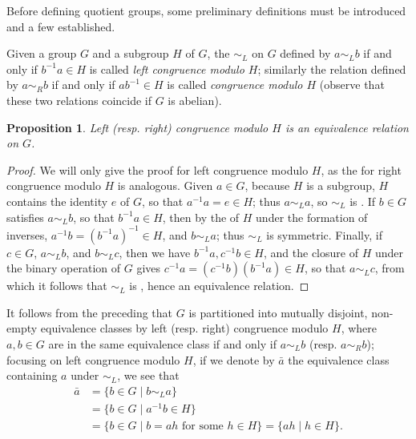 \documentclass{article}
\theoremstyle{plain}
\newtheorem*{proposition*}{Proposition}
\theoremstyle{definition}
\newcommand{\set}[1]{\{#1\}}
\begin{document}
Before defining quotient groups, some preliminary definitions must be introduced and a few  established.

Given a group $G$ and a subgroup $H$ of $G$, the  $\sim_L$ on $G$ defined by $a\sim_L b$ if and only 
if $b^{-1}a\in H$ is called \emph{left congruence modulo $H$}; similarly the relation defined by $a\sim_R b$ if 
and only if $ab^{-1}\in H$ is called \emph{ congruence modulo $H$} (observe that these two relations coincide if $G$ is abelian). 
\begin{proposition*}
Left (resp. right) congruence modulo $H$ is an equivalence relation on $G$.
\end{proposition*}
\begin{proof}
We will only give the proof for left congruence modulo $H$, as the  for right congruence modulo $H$ is analogous.
Given $a\in G$, because $H$ is a subgroup, $H$ contains the identity $e$ of $G$, so that $a^{-1}a=e\in H$; thus $a\sim_L a$, so $\sim_L$ is . If $b\in G$ satisfies $a\sim_L b$, so that $b^{-1}a\in H$, then by the  of $H$ under the formation of inverses, $a^{-1}b=(b^{-1}a)^{-1}\in H$, and $b\sim_L a$; thus $\sim_L$ is symmetric. Finally, if $c\in G$, $a\sim_L b$, and $b\sim_L c$, then we have $b^{-1}a,c^{-1}b\in H$, and the closure of $H$ under the binary operation of $G$ gives $c^{-1}a=(c^{-1}b)(b^{-1}a)\in H$, so that $a\sim_L c$, from which it follows that $\sim_L$ is , hence an equivalence relation.
\end{proof}

It follows from the preceding  that $G$ is partitioned into mutually disjoint, non-empty equivalence
classes by left (resp. right) congruence modulo $H$, where $a,b\in G$ are in the same equivalence class if and only if $a\sim_L b$ (resp. $a\sim_R b$); focusing on left congruence modulo $H$, if we denote by $\bar{a}$ the equivalence class containing $a$ under $\sim_L$, we see that
\begin{equation*}
\begin{split}
\bar{a}&=\set{b\in G\mid b\sim_L a}\\
&=\set{b\in G\mid a^{-1}b\in H}\\
&=\set{b\in G\mid b=ah\text{ for some }h\in H}=\set{ah\mid h\in H}\text{.}
\end{split}
\end{equation*}
\end{document}
